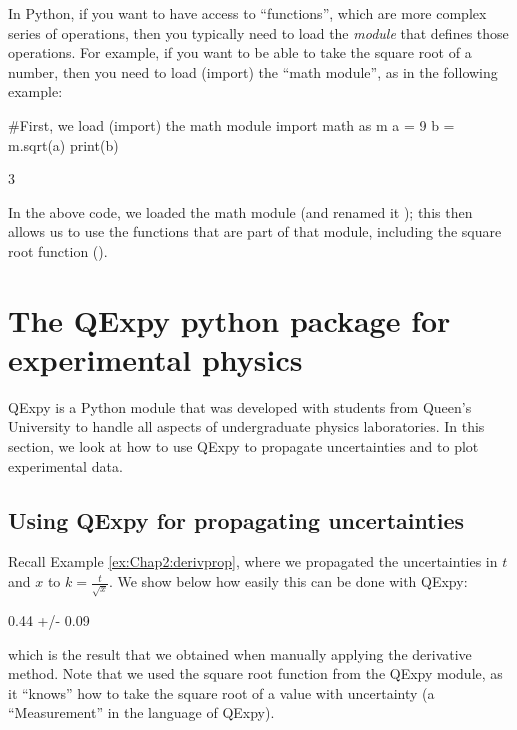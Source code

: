 In Python, if you want to have access to ``functions'', which are more complex series of operations, then you typically need to load the \textit{module} that defines those operations. For example, if you want to be able to take the square root of a number, then you need to load (import) the ``math module'', as in the following example:
\begin{python}[caption=Using functions from modules] 
#First, we load (import) the math module
import math as m
a = 9
b = m.sqrt(a)
print(b)
\end{python}
\begin{poutput}
3
\end{poutput}
In the above code, we loaded the math module (and renamed it ); this then allows us to use the functions that are part of that module, including the square root function ().

\section{The QExpy python package for experimental physics}
QExpy is a Python module that was developed with students from Queen's University to handle all aspects of undergraduate physics laboratories. In this section, we look at how to use QExpy to propagate uncertainties and to plot experimental data.

\subsection{Using QExpy for propagating uncertainties}
Recall Example \ref{ex:Chap2:derivprop}, where we propagated the uncertainties in $t$ and $x$ to $k=\frac{t}{\sqrt x}$. We show below how easily this can be done with QExpy:

\begin{poutput}
0.44 +/- 0.09
\end{poutput}
which is the result that we obtained when manually applying the derivative method. Note that we used the square root function from the QExpy module, as it ``knows'' how to take the square root of a value with uncertainty (a ``Measurement'' in the language of QExpy). 

